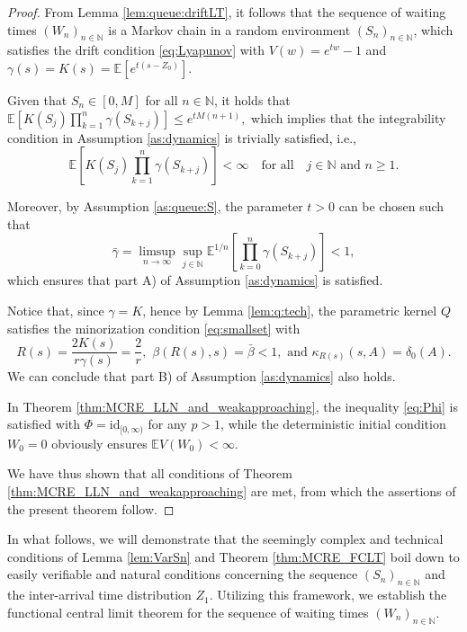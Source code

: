 \documentclass[a4paper,10pt]{article}
\newcommand{\N}{\mathbb{N}}
\newcommand{\E}{\mathbb{E}}
\begin{document}
\begin{proof}
	From Lemma \ref{lem:queue:driftLT}, it follows that the sequence of waiting times $(W_n)_{n\in\N}$ is a Markov chain in a random environment $(S_n)_{n \in \N}$, which satisfies the drift condition \eqref{eq:Lyapunov} with $V(w) = e^{tw} - 1$ and $\gamma(s) = K(s) = \E \left[e^{t(s-Z_0)}\right]$. 
	
	Given that $S_n \in [0, M]$ for all $n \in \N$, it holds that 
	$
	\E \left[ K(S_j) \prod_{k=1}^{n} \gamma(S_{k+j}) \right] \leq e^{tM(n+1)},
	$
	which implies that the integrability condition in Assumption \ref{as:dynamics} is trivially satisfied, i.e., 
	\[
	\E \left[ K(S_j) \prod_{k=1}^{n} \gamma(S_{k+j}) \right] < \infty \quad \text{for all} \quad j \in \N \text{ and } n \geq 1.
	\]
	
	Moreover, by Assumption \ref{as:queue:S}, the parameter $t > 0$ can be chosen such that 
	\[
	\bar{\gamma} = \limsup_{n \to \infty} \sup_{j \in \N} \E^{1/n} \left[ \prod_{k=0}^{n} \gamma(S_{k+j}) \right] < 1,
	\]
	which ensures that part A) of Assumption \ref{as:dynamics} is satisfied. 
	
	Notice that, since $\gamma = K$, hence by Lemma \ref{lem:q:tech}, the parametric kernel $Q$ satisfies the minorization condition \eqref{eq:smallset} with
	$$
	R(s) = \frac{2K(s)}{r\gamma(s)} = \frac{2}{r}, \,\, \beta(R(s),s) = \bar{\beta} < 1, \,\, \text{and} \,\, \kappa_{R(s)}(s,A) = \delta_0(A).
	$$
	We can conclude that part B) of Assumption \ref{as:dynamics} also holds.
	
	In Theorem \ref{thm:MCRE_LLN_and_weakapproaching}, the inequality \eqref{eq:Phi} is satisfied with $\Phi = \mathrm{id}_{[0,\infty)}$ for any $p > 1$, while the deterministic initial condition $W_0 = 0$ obviously ensures $\E V(W_0) < \infty$.
	
	We have thus shown that all conditions of Theorem \ref{thm:MCRE_LLN_and_weakapproaching} are met, from which the assertions of the present theorem follow.
\end{proof}

\smallskip 
In what follows, we will demonstrate that the seemingly complex and technical conditions of Lemma \ref{lem:VarSn} and Theorem \ref{thm:MCRE_FCLT} boil down to easily verifiable and natural conditions concerning the sequence $(S_n)_{n \in \mathbb{N}}$ and the inter-arrival time distribution $Z_1$. Utilizing this framework, we establish the functional central limit theorem for the sequence of waiting times $(W_n)_{n \in \mathbb{N}}$.
\end{document}

